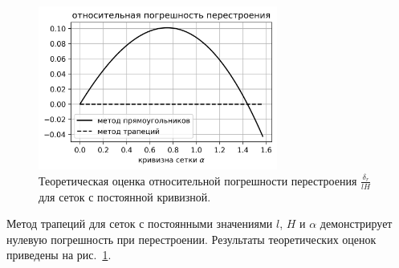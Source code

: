 \begin{figure}[h]
\onelinecaptionstrue
\centering
\includegraphics[width=0.7\textwidth]{pics/text_1_remesh_2d/delta_r_lH.png}
\caption{Теоретическая оценка относительной погрешности перестроения $\frac{\delta_r}{lH}$ для сеток с постоянной кривизной.}
\label{fig:text_1_remesh_2d_delta_r_lH}
\end{figure}

Метод трапеций для сеток с постоянными значениями $l$, $H$ и $\alpha$ демонстрирует нулевую погрешность при перестроении.
Результаты теоретических оценок приведены на рис.~\ref{fig:text_1_remesh_2d_delta_r_lH}.
